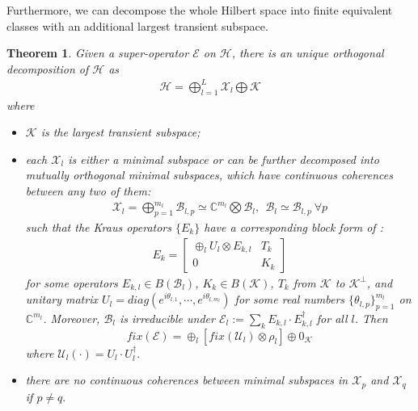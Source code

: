 \documentclass[journal]{IEEEtran}
\def\h{\ensuremath{\mathcal{H}}}
\def\u{\ensuremath{\mathcal{U}}}
\def\k{\ensuremath{\mathcal{K}}}
\def\u{\ensuremath{\mathcal{U}}}
\def\x{\ensuremath{\mathcal{X}}}
\def\b{\ensuremath{\mathcal{B}}}
\def\e{\ensuremath{\mathcal{E}}}
\def\k{\mathcal{K}}
\newtheorem{theorem}{Theorem}
\begin{document}
Furthermore, we can decompose the whole Hilbert space into finite equivalent classes  with an additional largest transient subspace. 
\begin{theorem}\label{Theo_CC_dec}
  Given a super-operator $\e$ on $\h$, there is an unique  orthogonal decomposition of $\h$ as
  \begin{eqnarray}\label{Eq_unique}
    \h=\bigoplus_{l=1}^L\x_l\bigoplus \k
  \end{eqnarray}
  where \begin{itemize}
    \item[(1)] $\k$ is the largest transient subspace;
    \item[(2)] each $\x_l$ is either a minimal subspace or can be further decomposed into mutually orthogonal minimal subspaces, which have continuous coherences between any two of them:
    \begin{eqnarray}\label{Eq_dec_CC}
      \x_l=\bigoplus_{p=1}^{m_l}\b_{l,p}\simeq\mathbb{C}^{m_l}\bigotimes \b_l, \ \ \b_l\simeq \b_{l,p} \ \forall p
    \end{eqnarray} 
    such that the Kraus operators $\{E_k\}$ have a corresponding block form of :
  \begin{eqnarray}\label{Eq_CC_dec_Kraus}
    E_k=\left[\begin{matrix}
  \oplus_l U_{l}\otimes E_{k,l} & T_k\\
0&K_k
\end{matrix}\right]
  \end{eqnarray}
for some operators $E_{k,l}\in B(\b_l)$, $K_k\in B(\k)$, $T_k$ from $\k$ to $\k^\perp$, and    unitary matrix $U_l=diag(e^{i\theta_{l,1}},\cdots,e^{i\theta_{l,m_l}})$ for some real numbers $\{\theta_{l,p}\}_{p=1}^{m_l}$ on $\mathbb{C}^{m_l}$. Moreover, $\b_l$ is irreducible under $\e_{l}:=\sum_{k}E_{k,l}\cdot E_{k,l}^\dagger$ for all $l$. Then
$$fix(\e)=\oplus_l[fix(\u_{l})\otimes \rho_l]\oplus 0_\k$$ 
where $\u_l(\cdot)=U_l\cdot U_l^\dagger$. %
    \item[(3)] there are no continuous coherences between minimal subspaces in $\x_p$ and $\x_q$ if $p\not =q.$
      \end{itemize}
  
\end{theorem}
\end{document}
